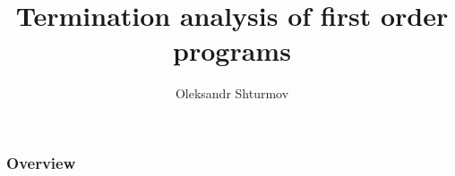 \documentclass[8pt, serif, xcolor=table]{beamer}
\title{Termination analysis of first order programs}
\author{Oleksandr Shturmov}
\begin{document}
\begin{frame}

\titlepage

\end{frame}


\begin{frame}

\frametitle{Overview}

\tableofcontents

\end{frame}
















\end{document}
